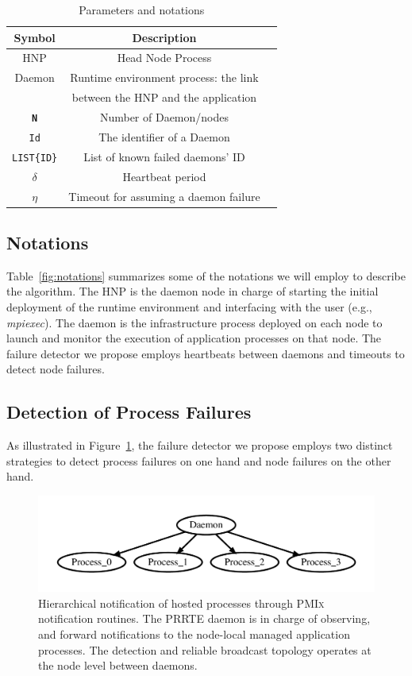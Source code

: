\documentclass[sigconf]{acmart}
\newcommand{\prrte}[0]{\textsc{PRRTE}\xspace}
\newcommand{\pmix}[0]{\textsc{PMIx}\xspace}
\begin{document}
\begin{table}
  \caption{Parameters and notations}\label{fig:notations}
  \label{tab:parameters}
  \begin{tabular}{ccl}
    \toprule
    Symbol & Description \\
    \midrule
    HNP & Head Node Process \\
    Daemon & Runtime environment process: the link  \\&  between the HNP and the application \\
    \texttt{\bf N} & Number of Daemon/nodes \\
    \texttt{Id} & The identifier of a Daemon \\
    \texttt{LIST\{ID\}} & List of known failed daemons' ID \\
    $\delta$ & Heartbeat period \\
    $\eta$ & Timeout for assuming a daemon failure\\
    \bottomrule
  \end{tabular}
\end{table}

\subsection{Notations}

Table~\ref{fig:notations} summarizes some of the notations we will employ 
to describe the algorithm. The HNP is the daemon node in charge of 
starting the initial deployment of the runtime environment and interfacing 
with the user (e.g., \emph{mpiexec}). The daemon is the infrastructure 
process deployed on each node to launch and monitor the execution of application 
processes on that node. The failure detector we propose employs heartbeats 
between daemons and timeouts to detect node failures.

\subsection{Detection of Process Failures}

As illustrated in Figure~\ref{fig:hosted}, the failure detector we propose 
employs two distinct strategies to detect process failures on one hand 
and node failures on the other hand. 

\begin{figure}[h]
  \centering
  \includegraphics[width=\linewidth]{server_client.pdf}
  \caption{Hierarchical notification of hosted processes through \pmix notification routines. The \prrte daemon is in charge of observing, and forward notifications to the node-local managed application processes. The detection and reliable broadcast 
  topology operates at the node level between daemons.}\label{fig:hosted}
\end{figure}
\end{document}

